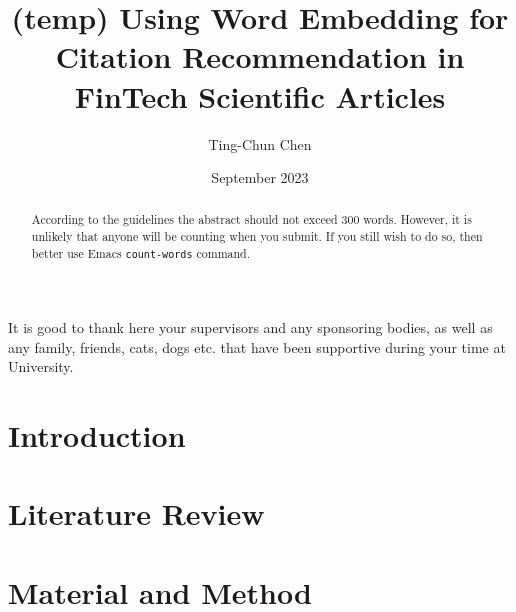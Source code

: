\documentclass[11pt]{uonthesis}
\title{(temp) Using Word Embedding for Citation Recommendation 
in FinTech Scientific Articles}
\author{Ting-Chun Chen}
\date{September 2023}
\begin{document}
\begin{frontmatter}
\maketitle
\tableofcontents

\begin{abstract}
According to the guidelines the abstract should not exceed 300 words.
However, it is unlikely that anyone will be counting when you submit.
If you still wish to do so, then better use Emacs \verb|count-words|
command.
\end{abstract}

\begin{acknowledgements}
It is good to thank here your supervisors and any sponsoring bodies,
as well as any family, friends, cats, dogs etc. that have been
supportive during your time at University.
\end{acknowledgements}


\end{frontmatter}

\chapter{Introduction}


\chapter{Literature Review}


\chapter{Material and Method}






\end{document}
